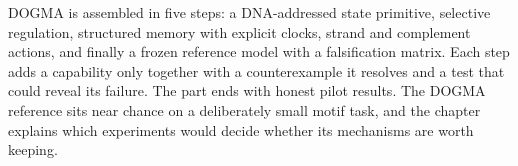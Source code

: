 DOGMA is assembled in five steps: a DNA-addressed state primitive, selective regulation, structured memory with explicit clocks, strand and complement actions, and finally a frozen reference model with a falsification matrix. Each step adds a capability only together with a counterexample it resolves and a test that could reveal its failure. The part ends with honest pilot results. The DOGMA reference sits near chance on a deliberately small motif task, and the chapter explains which experiments would decide whether its mechanisms are worth keeping.
